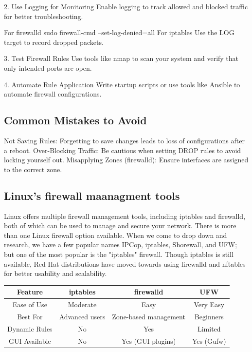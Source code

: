2. Use Logging for Monitoring
Enable logging to track allowed and blocked traffic for better troubleshooting.

For firewalld
sudo firewall-cmd --set-log-denied=all
For iptables
Use the LOG target to record dropped packets.

3. Test Firewall Rules
Use tools like nmap to scan your system and verify that only intended ports are open.

4. Automate Rule Application
Write startup scripts or use tools like Ansible to automate firewall configurations.   


\subsection{Common Mistakes to Avoid}
Not Saving Rules: Forgetting to save changes leads to loss of configurations after a reboot. 
\newline
Over-Blocking Traffic: Be cautious when setting DROP rules to avoid locking yourself out.
\newline
Misapplying Zones (firewalld): Ensure interfaces are assigned to the correct zone.


\subsection{Linux's firewall maanagment tools}
Linux offers multiple firewall management tools, including iptables and firewalld, 
both of which can be used to manage and secure your network.
%
There is more than one Linux firewall option available. 
When we come to drop down and research, we have a few popular names IPCop, iptables, Shorewall, and UFW; 
but one of the most popular is the "iptables" firewall. 
%
Though iptables is still available, Red Hat distributions have moved towards 
using firewalld and nftables for better usability and scalability.
\begin{center} 
\begin{longtable}{|c|c|c|c|} 
    \hline
    Feature	& iptables & firewalld & UFW \\
    \hline 
    Ease of Use	& Moderate & Easy & Very Easy \\
    \hline 
    Best For & Advanced users & Zone-based management & Beginners \\
    \hline 
    Dynamic Rules & No & Yes & Limited \\
    \hline 
    GUI Available & No	& Yes (GUI plugins)	& Yes (Gufw) \\
    \hline 
\end{longtable} 
\end{center}  


